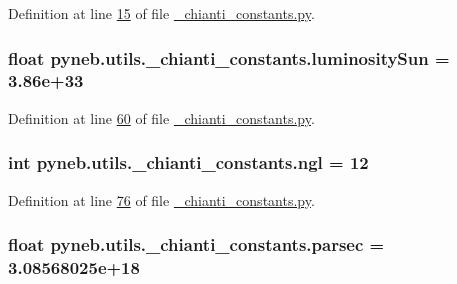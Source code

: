 Definition at line \hyperlink{__chianti__constants_8py_source_l00015}{15} of file \hyperlink{__chianti__constants_8py_source}{\+\_\+chianti\+\_\+constants.\+py}.

\hypertarget{namespacepyneb_1_1utils_1_1__chianti__constants_abc765dba69adeece000b2f7ffed93877}{}
\subsubsection[{luminosity\+Sun}]{\setlength{\rightskip}{0pt plus 5cm}float pyneb.\+utils.\+\_\+chianti\+\_\+constants.\+luminosity\+Sun = 3.\+86e+33}\label{namespacepyneb_1_1utils_1_1__chianti__constants_abc765dba69adeece000b2f7ffed93877}


Definition at line \hyperlink{__chianti__constants_8py_source_l00060}{60} of file \hyperlink{__chianti__constants_8py_source}{\+\_\+chianti\+\_\+constants.\+py}.

\hypertarget{namespacepyneb_1_1utils_1_1__chianti__constants_aa56aafac98ada2bbf340753caef7378f}{}
\subsubsection[{ngl}]{\setlength{\rightskip}{0pt plus 5cm}int pyneb.\+utils.\+\_\+chianti\+\_\+constants.\+ngl = 12}\label{namespacepyneb_1_1utils_1_1__chianti__constants_aa56aafac98ada2bbf340753caef7378f}


Definition at line \hyperlink{__chianti__constants_8py_source_l00076}{76} of file \hyperlink{__chianti__constants_8py_source}{\+\_\+chianti\+\_\+constants.\+py}.

\hypertarget{namespacepyneb_1_1utils_1_1__chianti__constants_abcf6354e4070185098bde01f7ce5c8aa}{}
\subsubsection[{parsec}]{\setlength{\rightskip}{0pt plus 5cm}float pyneb.\+utils.\+\_\+chianti\+\_\+constants.\+parsec = 3.\+08568025e+18}\label{namespacepyneb_1_1utils_1_1__chianti__constants_abcf6354e4070185098bde01f7ce5c8aa}


